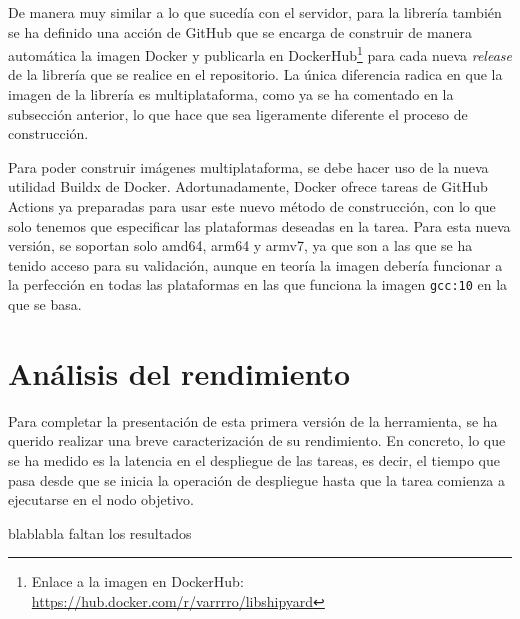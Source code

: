 De manera muy similar a lo que sucedía con el servidor, para la librería también
se ha definido una acción de GitHub que se encarga de construir de manera
automática la imagen Docker y publicarla en DockerHub\footnote{Enlace a la
    imagen en DockerHub: \url{https://hub.docker.com/r/varrrro/libshipyard}} para
cada nueva \textit{release} de la librería que se realice en el repositorio. La
única diferencia radica en que la imagen de la librería es multiplataforma, como
ya se ha comentado en la subsección anterior, lo que hace que sea ligeramente
diferente el proceso de construcción.

Para poder construir imágenes multiplataforma, se debe hacer uso de la nueva
utilidad Buildx de Docker. Adortunadamente, Docker ofrece tareas de GitHub
Actions ya preparadas para usar este nuevo método de construcción, con lo que
solo tenemos que especificar las plataformas deseadas en la tarea. Para esta
nueva versión, se soportan solo amd64, arm64 y armv7, ya que son a las que se ha
tenido acceso para su validación, aunque en teoría la imagen debería funcionar a
la perfección en todas las plataformas en las que funciona la imagen
\texttt{gcc:10} en la que se basa.

\section{Análisis del rendimiento}

Para completar la presentación de esta primera versión de la herramienta, se ha
querido realizar una breve caracterización de su rendimiento. En concreto, lo
que se ha medido es la latencia en el despliegue de las tareas, es decir, el
tiempo que pasa desde que se inicia la operación de despliegue hasta que la
tarea comienza a ejecutarse en el nodo objetivo.

blablabla faltan los resultados